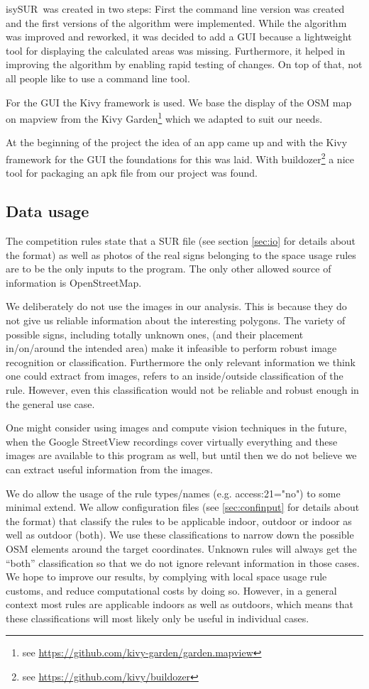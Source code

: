 \documentclass[11pt,fleqn]{book} %
\newcommand{\ProjectTitle}{isySUR}
\newcommand{\pt}{\ProjectTitle}
\begin{document}
\pt\ was created in two steps: First the command line version was created and the first versions of the algorithm were implemented. While the algorithm was improved and reworked, it was decided to add a GUI because a lightweight tool for displaying the calculated areas was missing. Furthermore, it helped in improving the algorithm by enabling rapid testing of changes. On top of that, not all people like to use a command line tool.

For the GUI the Kivy framework is used. We base the display of the OSM map on mapview from the Kivy Garden\footnote{see \url{https://github.com/kivy-garden/garden.mapview}} which we adapted to suit our needs.

At the beginning of the project the idea of an app came up and with the Kivy framework for the GUI the foundations for this was laid. With buildozer\footnote{see \url{https://github.com/kivy/buildozer}} a nice tool for packaging an apk file from our project was found.

\subsection{Data usage}\label{sec:data_usage}
The competition rules state that a SUR file (see section \ref{sec:io} for details about the format) as well as photos of the real signs belonging to the space usage rules are to be the only inputs to the program. The only other allowed source of information is OpenStreetMap. 

We deliberately do not use the images in our analysis. This is because they do not give us reliable information about the interesting polygons. The variety of possible signs, including totally unknown ones, (and their placement in/on/around the intended area) make it infeasible to perform robust image recognition or classification. Furthermore the only relevant information we think one could extract from images, refers to an inside/outside classification of the rule. However, even this classification would not be reliable and robust enough in the general use case.

One might consider using images and compute vision techniques in the future, when the Google StreetView recordings cover virtually everything and these images are available to this program as well, but until then we do not believe we can extract useful information from the images.

We do allow the usage of the rule types/names (e.g. access:21="no") to some minimal extend. We allow configuration files (see \ref{sec:confinput} for details about the format) that classify the rules to be applicable indoor, outdoor or indoor as well as outdoor (both). We use these classifications to narrow down the possible OSM elements around the target coordinates. Unknown rules will always get the ``both'' classification so that we do not ignore relevant information in those cases. We hope to improve our results, by complying with local space usage rule customs, and reduce computational costs by doing so. However, in a general context most rules are applicable indoors as well as outdoors, which means that these classifications will most likely only be useful in individual cases. 
\end{document}

